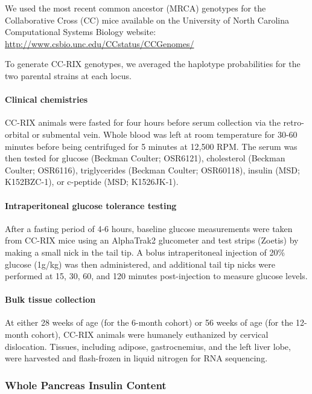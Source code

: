 \documentclass[
]{article}
\begin{document}
We used the most recent common ancestor (MRCA) genotypes for the
Collaborative Cross (CC) mice available on the University of North
Carolina Computational Systems Biology website:
\url{http://www.csbio.unc.edu/CCstatus/CCGenomes/}

To generate CC-RIX genotypes, we averaged the haplotype probabilities
for the two parental strains at each locus.

\paragraph{Clinical chemistries}\label{clinical-chemistries}

CC-RIX animals were fasted for four hours before serum collection via
the retro-orbital or submental vein. Whole blood was left at room
temperature for 30-60 minutes before being centrifuged for 5 minutes at
12,500 RPM. The serum was then tested for glucose (Beckman Coulter;
OSR6121), cholesterol (Beckman Coulter; OSR6116), triglycerides (Beckman
Coulter; OSR60118), insulin (MSD; K152BZC-1), or c-peptide (MSD;
K1526JK-1).

\paragraph{Intraperitoneal glucose tolerance
testing}\label{intraperitoneal-glucose-tolerance-testing}

After a fasting period of 4-6 hours, baseline glucose measurements were
taken from CC-RIX mice using an AlphaTrak2 glucometer and test strips
(Zoetis) by making a small nick in the tail tip. A bolus intraperitoneal
injection of 20\% glucose (1g/kg) was then administered, and additional
tail tip nicks were performed at 15, 30, 60, and 120 minutes
post-injection to measure glucose levels.

\paragraph{Bulk tissue collection}\label{bulk-tissue-collection}

At either 28 weeks of age (for the 6-month cohort) or 56 weeks of age
(for the 12-month cohort), CC-RIX animals were humanely euthanized by
cervical dislocation. Tissues, including adipose, gastrocnemius, and the
left liver lobe, were harvested and flash-frozen in liquid nitrogen for
RNA sequencing.

\subsubsection{Whole Pancreas Insulin
Content}\label{whole-pancreas-insulin-content}
\end{document}
